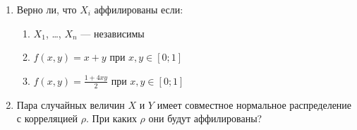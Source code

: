 \begin{enumerate}
\item Верно ли, что $ X_{i} $ аффилированы если:

\begin{enumerate}
\item $ X_{1} $, \ldots, $ X_{n} $ — независимы
\item $ f(x,y)=x+y $ при $ x,y\in [0;1] $
\item $ f(x,y)=\frac{1+4xy}{2} $ при $ x,y\in [0;1] $
\end{enumerate}

\item Пара случайных величин $ X $ и $ Y $ имеет совместное нормальное распределение с корреляцией $ \rho $. При каких $ \rho $ они будут аффилированы?

\end{enumerate}


